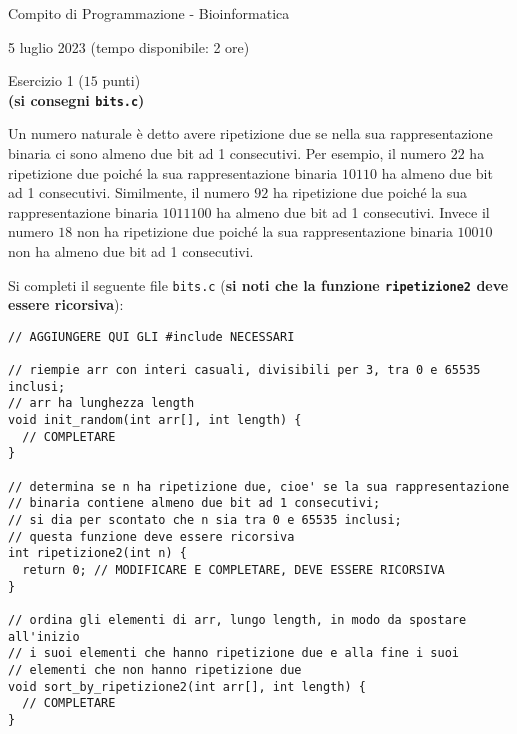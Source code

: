 \documentclass[12pt]{article}
\begin{document}
\begin{center}{\LARGE Compito di Programmazione - Bioinformatica}\\
\begin{center}
  \large 5 luglio 2023 (tempo disponibile: 2 ore)
\end{center}
\end{center}

\vspace*{1ex}
\begin{center}{\Large Esercizio 1} ($15$ punti)\\
  \textbf{(si consegni \texttt{bits.c})}
\end{center}

Un numero naturale \`e detto avere ripetizione due se
nella sua rappresentazione binaria ci sono almeno due bit ad 1 consecutivi. Per esempio, il
numero $22$ ha ripetizione due poich\'e la sua rappresentazione
binaria $10110$ ha almeno due bit ad 1 consecutivi. Similmente, il numero $92$ ha ripetizione due
poich\'e la sua rappresentazione binaria $1011100$ ha almeno due bit ad 1 consecutivi.
Invece il numero $18$ non ha ripetizione due poich\'e la sua rappresentazione binaria
$10010$ non ha almeno due bit ad 1 consecutivi.

Si completi il seguente file \texttt{bits.c} (\textbf{si noti che la funzione
\texttt{ripetizione2} deve essere ricorsiva}):

\begin{center}
  \begin{lstlisting}[language=myC]
// AGGIUNGERE QUI GLI #include NECESSARI

// riempie arr con interi casuali, divisibili per 3, tra 0 e 65535 inclusi;
// arr ha lunghezza length
void init_random(int arr[], int length) {
  // COMPLETARE
}

// determina se n ha ripetizione due, cioe' se la sua rappresentazione
// binaria contiene almeno due bit ad 1 consecutivi;
// si dia per scontato che n sia tra 0 e 65535 inclusi;
// questa funzione deve essere ricorsiva
int ripetizione2(int n) {
  return 0; // MODIFICARE E COMPLETARE, DEVE ESSERE RICORSIVA
}

// ordina gli elementi di arr, lungo length, in modo da spostare all'inizio
// i suoi elementi che hanno ripetizione due e alla fine i suoi
// elementi che non hanno ripetizione due
void sort_by_ripetizione2(int arr[], int length) {
  // COMPLETARE
}
  \end{lstlisting}
\end{center}
\end{document}
